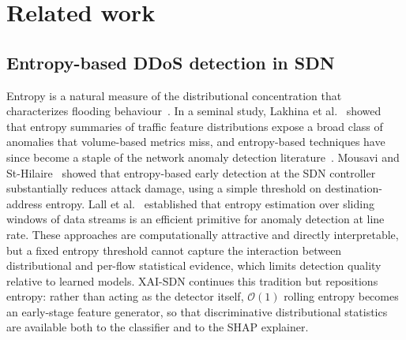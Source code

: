 ﻿\documentclass[journal]{IEEEtran}
\begin{document}
\section{Related work}
\label{sec:related}

\subsection{Entropy-based DDoS detection in SDN}
Entropy is a natural measure of the distributional concentration that characterizes flooding behaviour~\cite{nychis2008entropy}. In a seminal study, Lakhina et al.~\cite{lakhina2005mining} showed that entropy summaries of traffic feature distributions expose a broad class of anomalies that volume-based metrics miss, and entropy-based techniques have since become a staple of the network anomaly detection literature~\cite{bhuyan2014network}. Mousavi and St-Hilaire~\cite{mousavi2015early} showed that entropy-based early detection at the SDN controller substantially reduces attack damage, using a simple threshold on destination-address entropy. Lall et al.~\cite{lall2006entropy} established that entropy estimation over sliding windows of data streams is an efficient primitive for anomaly detection at line rate. These approaches are computationally attractive and directly interpretable, but a fixed entropy threshold cannot capture the interaction between distributional and per-flow statistical evidence, which limits detection quality relative to learned models. XAI-SDN continues this tradition but repositions entropy: rather than acting as the detector itself, $\mathcal{O}(1)$ rolling entropy becomes an early-stage feature generator, so that discriminative distributional statistics are available both to the classifier and to the SHAP explainer.
\end{document}
